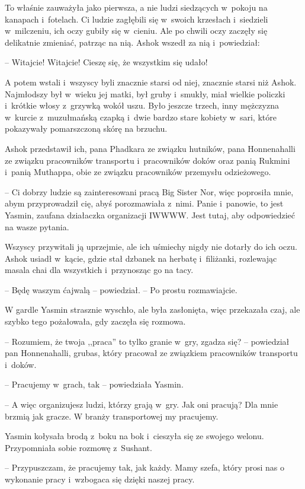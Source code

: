 \documentclass[oneside,polish,11pt,rmheadings]{mwbk}
\begin{document}
To właśnie zauważyła jako pierwsza, a nie ludzi siedzących w~pokoju na kanapach i~fotelach. Ci ludzie zagłębili się w~swoich krzesłach i~siedzieli w~milczeniu, ich oczy gubiły się w~cieniu. Ale po chwili oczy zaczęły się delikatnie zmieniać, patrząc na nią. Ashok wszedł za nią i~powiedział: 

-- Witajcie! Witajcie! Cieszę się, że wszystkim się udało!

A potem wstali i~wszyscy byli znacznie starsi od niej, znacznie starsi niż Ashok. Najmłodszy był w~wieku jej matki, był gruby i~smukły, miał wielkie policzki i~krótkie włosy z~grzywką wokół uszu. Było jeszcze trzech, inny mężczyzna w~kurcie z~muzułmańską czapką i~dwie bardzo stare kobiety w~sari, które pokazywały pomarszczoną skórę na brzuchu.

Ashok przedstawił ich, pana Phadkara ze związku hutników, pana Honnenahalli ze związku pracowników transportu i~pracowników doków oraz panią Rukmini i~panią Muthappa, obie ze związku pracowników przemysłu odzieżowego.

-- Ci dobrzy ludzie są zainteresowani pracą Big Sister Nor, więc poprosiła mnie, abym przyprowadził cię, abyś porozmawiała z~nimi. Panie i~panowie, to jest Yasmin, zaufana działaczka organizacji IWWWW. Jest tutaj, aby odpowiedzieć na wasze pytania.

Wszyscy przywitali ją uprzejmie, ale ich uśmiechy nigdy nie dotarły do ich oczu. Ashok usiadł w~kącie, gdzie stał dzbanek na herbatę i~filiżanki, rozlewając masala chai dla wszystkich i~przynosząc go na tacy. 

-- Będę waszym ćajwalą -- powiedział. -- Po prostu rozmawiajcie.

W gardle Yasmin strasznie wyschło, ale była zasłonięta, więc przekazała czaj, ale szybko tego pożałowała, gdy zaczęła się rozmowa.

-- Rozumiem, że twoja ,,praca'' to tylko granie w~gry, zgadza się? -- powiedział pan Honnenahalli, grubas, który pracował ze związkiem pracowników transportu i~doków.

-- Pracujemy w~grach, tak -- powiedziała Yasmin.

-- A więc organizujesz ludzi, którzy grają w~gry. Jak oni pracują? Dla mnie brzmią jak gracze. W branży transportowej my pracujemy.

Yasmin kołysała brodą z~boku na bok i~cieszyła się ze swojego welonu. Przypomniała sobie rozmowę z~Sushant. 

-- Przypuszczam, że pracujemy tak, jak każdy. Mamy szefa, który prosi nas o wykonanie pracy i~wzbogaca się dzięki naszej pracy.
\end{document}
